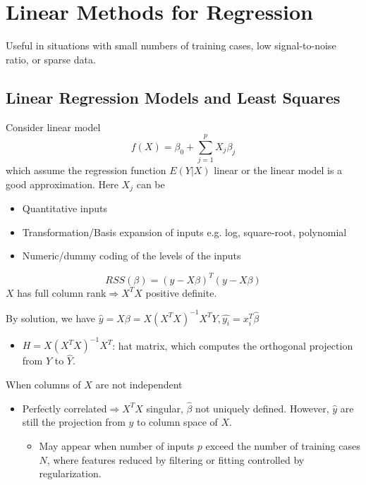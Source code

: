 \chapter{Linear Methods for Regression}

Useful in situations with small numbers of training cases, low signal-to-noise ratio, 
or sparse data. 
\section{Linear Regression Models and Least Squares}
Consider linear model
\begin{equation*}
	f(X)=\beta_0+\sum_{j=1}^{p}X_j\beta_j
\end{equation*}
which assume the regression function $E(Y|X)$ linear or the linear model is a good 
approximation. 
Here $X_j$ can be
\begin{itemize}
	\item Quantitative inputs
	\item Transformation/Basis expansion of inputs e.g. log, square-root, polynomial
	\item Numeric/dummy coding of the levels of the inputs
\end{itemize}
\begin{equation*}
	RSS(\beta)=(y-X\beta)^T(y-X\beta)
\end{equation*}
$X$ has full column rank$\Rightarrow X^TX$ positive definite. 

By solution, we have $\hat{y}=X\beta=X(X^TX)^{-1}X^TY, \hat{y_i}=x_i^T\hat{\beta}$
\begin{itemize}
    \item $H=X(X^TX)^{-1}X^T$: hat matrix, which computes the orthogonal projection 
    from $Y$ to $\hat{Y}$. 
\end{itemize}

When columns of $X$ are not independent
\begin{itemize}
    \item Perfectly correlated$\Rightarrow X^TX$ singular, $\hat{\beta}$ not uniquely 
    defined. However, $\hat{y}$ are still the projection from $y$ to column space of 
    $X$. 
	\begin{itemize}
        \item May appear when number of inputs $p$ exceed the number of training cases $N$, 
        where features reduced by filtering or fitting controlled by regularization. 
	\end{itemize}
\end{itemize}

